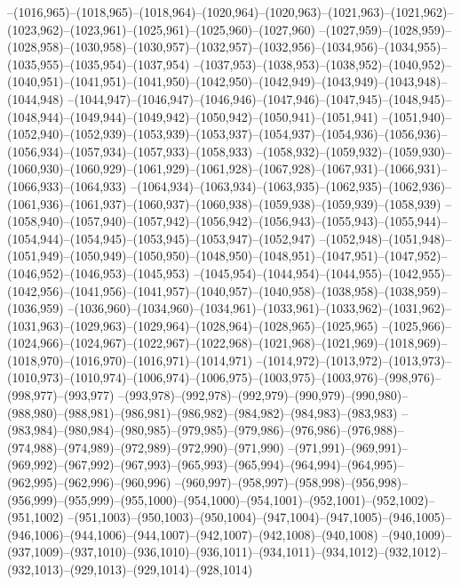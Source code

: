 --(1016,965)--(1018,965)--(1018,964)--(1020,964)--(1020,963)--(1021,963)--(1021,962)--(1023,962)--(1023,961)--(1025,961)--(1025,960)--(1027,960)
--(1027,959)--(1028,959)--(1028,958)--(1030,958)--(1030,957)--(1032,957)--(1032,956)--(1034,956)--(1034,955)--(1035,955)--(1035,954)--(1037,954)
--(1037,953)--(1038,953)--(1038,952)--(1040,952)--(1040,951)--(1041,951)--(1041,950)--(1042,950)--(1042,949)--(1043,949)--(1043,948)--(1044,948)
--(1044,947)--(1046,947)--(1046,946)--(1047,946)--(1047,945)--(1048,945)--(1048,944)--(1049,944)--(1049,942)--(1050,942)--(1050,941)--(1051,941)
--(1051,940)--(1052,940)--(1052,939)--(1053,939)--(1053,937)--(1054,937)--(1054,936)--(1056,936)--(1056,934)--(1057,934)--(1057,933)--(1058,933)
--(1058,932)--(1059,932)--(1059,930)--(1060,930)--(1060,929)--(1061,929)--(1061,928)--(1067,928)--(1067,931)--(1066,931)--(1066,933)--(1064,933)
--(1064,934)--(1063,934)--(1063,935)--(1062,935)--(1062,936)--(1061,936)--(1061,937)--(1060,937)--(1060,938)--(1059,938)--(1059,939)--(1058,939)
--(1058,940)--(1057,940)--(1057,942)--(1056,942)--(1056,943)--(1055,943)--(1055,944)--(1054,944)--(1054,945)--(1053,945)--(1053,947)--(1052,947)
--(1052,948)--(1051,948)--(1051,949)--(1050,949)--(1050,950)--(1048,950)--(1048,951)--(1047,951)--(1047,952)--(1046,952)--(1046,953)--(1045,953)
--(1045,954)--(1044,954)--(1044,955)--(1042,955)--(1042,956)--(1041,956)--(1041,957)--(1040,957)--(1040,958)--(1038,958)--(1038,959)--(1036,959)
--(1036,960)--(1034,960)--(1034,961)--(1033,961)--(1033,962)--(1031,962)--(1031,963)--(1029,963)--(1029,964)--(1028,964)--(1028,965)--(1025,965)
--(1025,966)--(1024,966)--(1024,967)--(1022,967)--(1022,968)--(1021,968)--(1021,969)--(1018,969)--(1018,970)--(1016,970)--(1016,971)--(1014,971)
--(1014,972)--(1013,972)--(1013,973)--(1010,973)--(1010,974)--(1006,974)--(1006,975)--(1003,975)--(1003,976)--(998,976)--(998,977)--(993,977)
--(993,978)--(992,978)--(992,979)--(990,979)--(990,980)--(988,980)--(988,981)--(986,981)--(986,982)--(984,982)--(984,983)--(983,983)
--(983,984)--(980,984)--(980,985)--(979,985)--(979,986)--(976,986)--(976,988)--(974,988)--(974,989)--(972,989)--(972,990)--(971,990)
--(971,991)--(969,991)--(969,992)--(967,992)--(967,993)--(965,993)--(965,994)--(964,994)--(964,995)--(962,995)--(962,996)--(960,996)
--(960,997)--(958,997)--(958,998)--(956,998)--(956,999)--(955,999)--(955,1000)--(954,1000)--(954,1001)--(952,1001)--(952,1002)--(951,1002)
--(951,1003)--(950,1003)--(950,1004)--(947,1004)--(947,1005)--(946,1005)--(946,1006)--(944,1006)--(944,1007)--(942,1007)--(942,1008)--(940,1008)
--(940,1009)--(937,1009)--(937,1010)--(936,1010)--(936,1011)--(934,1011)--(934,1012)--(932,1012)--(932,1013)--(929,1013)--(929,1014)--(928,1014)
